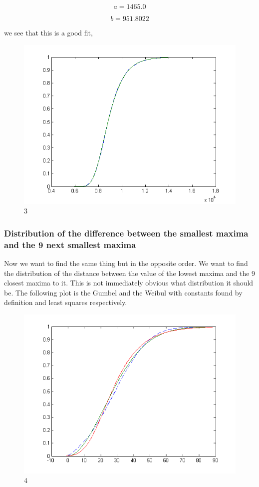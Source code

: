 \documentclass[12pt]{article}
\begin{document}
\[a = 1465.0\]

\[b = 951.8022\]

we see that this is a good fit,

\begin{figure}[hpt]
	\centering
		\includegraphics[width=1.00\textwidth]{pnR_512_top10_gumbel.png}
	\caption{3}
	\label{fig:pnR_512_top10_gumbel}
\end{figure}

\subsubsection{Distribution of the difference between the smallest maxima and the 9 next smallest maxima}

Now we want to find the same thing but in the opposite order. We want to find the distribution of the distance between the value of the lowest maxima and the 9 closest maxima to it. This is not immediately obvious what distribution it should be. The following plot is the Gumbel and the Weibul with constants found by definition and least squares respectively.

\begin{figure}[hpt]
	\centering
		\includegraphics[width=1.00\textwidth]{pnR_512_bot10diff_gumbel_weibull.png}
	\caption{4}
	\label{fig:pnR_512_bot10diff_gumbel_weibull}
\end{figure}
\end{document}
